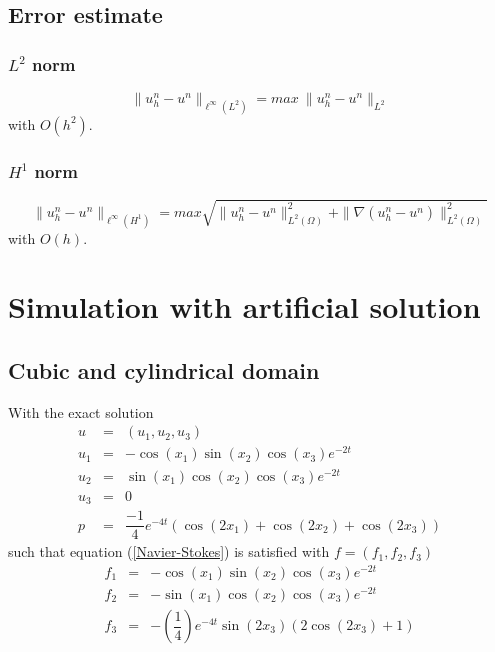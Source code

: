 \documentclass[a4paper]{article}
\begin{document}
\subsection{Error estimate}
\subsubsection{$ L^{2} $ norm}
\[\| u_{h}^{n}-u^{n} \|_{\ell^\infty(L^2)} =  max \ \| u_{h}^{n}-u^{n} \|_{L^{2}}\]
with $ O(h^2) $.
\subsubsection{$ H^{1} $ norm}
\[\| u_{h}^{n}-u^{n} \|_{\ell^\infty(H^{1})} = max \sqrt{\| u_{h}^{n}-u^{n} \|_{L^2(\Omega)}^{2} + \| \nabla (u_{h}^{n}-u^{n}) \|_{L^2(\Omega)}^{2}}\]
with $ O(h) $.

\newpage
\section{Simulation with artificial solution}

\subsection{Cubic and cylindrical domain}
With the exact solution
\begin{eqnarray}\nonumber
u &=& (u_{1},u_{2},u_{3}) \\ \nonumber
u_{1} &=& -\cos(x_{1}) \sin(x_{2}) \cos(x_3) e^{-2t}\\ \nonumber
u_{2} &=& \sin(x_{1}) \cos(x_{2}) \cos(x_3) e^{-2t}\\ \nonumber
u_{3} &=& 0 \\ \nonumber
p&=& \dfrac{-1}{4} e^{-4t} (\cos(2x_1)+\cos(2x_2)+\cos(2x_3))
\end{eqnarray}
such that equation (\ref{Navier-Stokes}) is satisfied with $ f = (f_{1},f_{2},f_3) $
\begin{eqnarray}\nonumber
f_{1} &=& -\cos(x_1) \sin(x_2) \cos(x_3) e^{-2t} \\ \nonumber
f_{2} &=& -\sin(x_1) \cos(x_2) \cos(x_3) e^{-2t} \\ \nonumber
f_{3} &=& -(\dfrac{1}{4})e^{-4t}\sin(2x_3)(2\cos(2x_3)+1)
\end{eqnarray}
\end{document}
